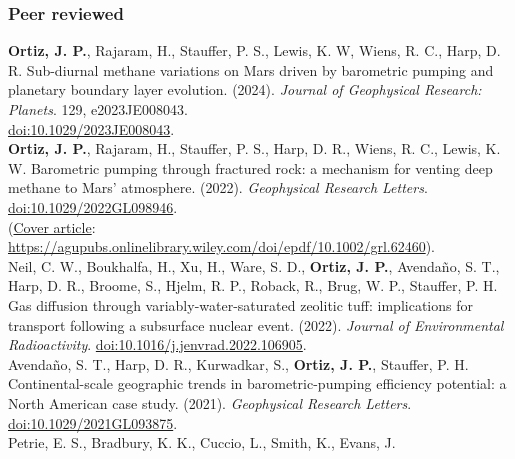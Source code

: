 \documentclass[11pt, letterpaper]{article}
\newcommand{\years}[1]{\marginnote{\scriptsize #1}}
\begin{document}
\subsubsection*{Peer reviewed}

\noindent
\hypersetup{linkcolor=black,citecolor=blue,filecolor=black,urlcolor=black} 
\years{2024}\textbf{Ortiz, J. P.}, Rajaram, H., Stauffer, P. S., Lewis, K. W,
Wiens, R. C., Harp, D. R.  Sub-diurnal methane variations on Mars driven by
barometric pumping and planetary boundary layer evolution. (2024). \emph{Journal of
Geophysical Research: Planets}. 129, e2023JE008043.\\
\href{https://agupubs.onlinelibrary.wiley.com/doi/epdf/10.1029/2023JE008043}{doi:10.1029/2023JE008043}.\\ 
%
\years{2022}\textbf{Ortiz, J. P.}, Rajaram, H., Stauffer, P. S., Harp, D. R.,
Wiens, R. C., Lewis, K. W.  Barometric pumping through fractured rock: a
mechanism for venting deep methane to Mars' atmosphere. (2022). \emph{Geophysical
Research Letters}. 
\href{https://agupubs.onlinelibrary.wiley.com/doi/epdf/10.1029/2022GL098946}{doi:10.1029/2022GL098946}. \\
\hypersetup{linkcolor=black,citecolor=blue,filecolor=black,urlcolor=blue} 
(\underline{Cover article}:
\href{https://agupubs.onlinelibrary.wiley.com/doi/epdf/10.1002/grl.62460}{https://agupubs.onlinelibrary.wiley.com/doi/epdf/10.1002/grl.62460}).\\ 
%
\hypersetup{linkcolor=black,citecolor=blue,filecolor=black,urlcolor=black} 
\years{2022}Neil, C. W., Boukhalfa, H., Xu, H., Ware, S. D., \textbf{Ortiz, J.
P.}, Avendaño, S. T., Harp, D. R., Broome, S., Hjelm, R. P., Roback, R., Brug,
W. P., Stauffer, P. H. Gas diffusion through variably-water-saturated zeolitic
tuff: implications for transport following a subsurface nuclear event. (2022).
\emph{Journal of Environmental Radioactivity}.
\href{https://www.sciencedirect.com/science/article/pii/S0265931X22000959/pdfft?md5=9a2aafb80eab7a1daa481601c5af9247&pid=1-s2.0-S0265931X22000959-main.pdf}{doi:10.1016/j.jenvrad.2022.106905}.\\
%
\years{2021}Avendaño, S. T., Harp, D. R., Kurwadkar, S., \textbf{Ortiz, J.
P.}, Stauffer, P. H. Continental-scale geographic trends in barometric-pumping
efficiency potential: a North American case study. (2021). 
\emph{Geophysical Research Letters}.  
\href{https://agupubs.onlinelibrary.wiley.com/doi/pdf/10.1029/2021GL093875}{doi:10.1029/2021GL093875}.\\
%
\years{2020}Petrie, E. S., Bradbury, K. K., Cuccio, L., Smith, K., Evans, J.
\end{document}
